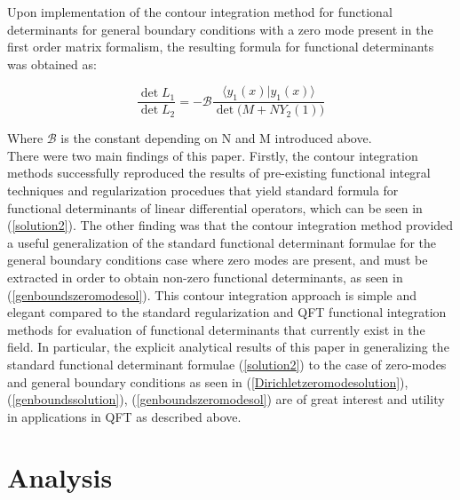 \documentclass[12]{article}
\begin{document}
Upon implementation of the contour integration method for functional determinants for general boundary conditions with a zero mode present in the first order matrix formalism, the resulting formula for functional determinants was obtained as: 

\begin{equation} \label{genboundszeromodesol}
   \frac{\det{L_1}}{\det{L_2}} = -\mathcal{B}\frac{\langle y_1(x)|y_1(x)\rangle}{\det{(M+NY_2(1)})}
\end{equation}

Where \(\mathcal{B}\) is the constant depending on N and M introduced above.\\

There were two main findings of this paper. Firstly, the contour integration methods successfully reproduced the results of pre-existing functional integral techniques and regularization procedues that yield standard formula for functional determinants of linear differential operators, which can be seen in (\ref{solution2}). The other finding was that the contour integration method provided a useful generalization of the standard functional determinant formulae for the general boundary conditions case where zero modes are present, and must be extracted in order to obtain non-zero functional determinants, as seen in (\ref{genboundszeromodesol}). This contour integration approach is simple and elegant compared to the standard regularization and QFT functional integration methods for evaluation of functional determinants that currently exist in the field. In particular, the explicit analytical results of this paper in generalizing the standard functional determinant formulae (\ref{solution2}) to the case of zero-modes and general boundary conditions as seen in (\ref{Dirichletzeromodesolution}), (\ref{genboundssolution}), (\ref{genboundszeromodesol}) are of great interest and utility in applications in QFT as described above. 

\section{Analysis}
\end{document}
